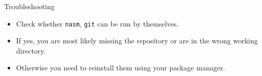\documentclass{beamer}
\begin{document}
\begin{frame}{Troubleshooting}
  \begin{itemize}
		\item Check whether \texttt{nasm}, \texttt{git} can be run by themselves.
		\item If yes, you are most likely missing the repository or are in the wrong working directory.
		\item Otherwise you need to reinstall them using your package manager.
  \end{itemize}
\end{frame}
\end{document}
